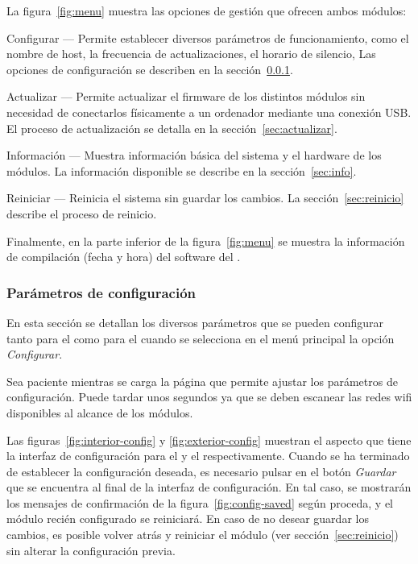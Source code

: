 La figura~\ref{fig:menu} muestra las opciones de gestión que ofrecen ambos módulos:

\begin{descriptioncompact}

\item[Configurar] --- Permite establecer diversos parámetros de funcionamiento, como el nombre de host, la frecuencia de actualizaciones, el horario de silencio, \etc Las opciones de configuración se describen en la sección~\ref{sec:config}.

\item[Actualizar] --- Permite actualizar el firmware de los distintos módulos sin necesidad de conectarlos físicamente a un ordenador mediante una conexión USB. El proceso de actualización se detalla en la sección~\ref{sec:actualizar}.

\item[Información] --- Muestra información básica del sistema y el hardware de los módulos. La información disponible se describe en la sección~\ref{sec:info}.

\item[Reiniciar] --- Reinicia el sistema sin guardar los cambios. La sección~\ref{sec:reinicio} describe el proceso de reinicio.

\end{descriptioncompact}

Finalmente, en la parte inferior de la figura~\ref{fig:menu} se muestra la información de compilación (fecha y hora) del software del \CMS.

\subsubsection{Parámetros de configuración}
\label{sec:config}

En esta sección se detallan los diversos parámetros que se pueden configurar tanto para el \MIE como para el \MEE cuando se selecciona en el menú principal la opción \emph{Configurar}.

Sea paciente mientras se carga la página que permite ajustar los parámetros de configuración. Puede tardar unos segundos ya que se deben escanear las redes wifi disponibles al alcance de los módulos.
\importantend

Las figuras~\ref{fig:interior-config} y \ref{fig:exterior-config} muestran el aspecto que tiene la interfaz de configuración para el \MI y el \ME respectivamente. Cuando se ha terminado de establecer la configuración deseada, es necesario pulsar en el botón \emph{Guardar} que se encuentra al final de la interfaz de configuración. En tal caso, se mostrarán los mensajes de confirmación de la figura~\ref{fig:config-saved} según proceda, y el módulo recién configurado se reiniciará. En caso de no desear guardar los cambios, es posible volver atrás y reiniciar el módulo (ver sección~\ref{sec:reinicio}) sin alterar la configuración previa.

